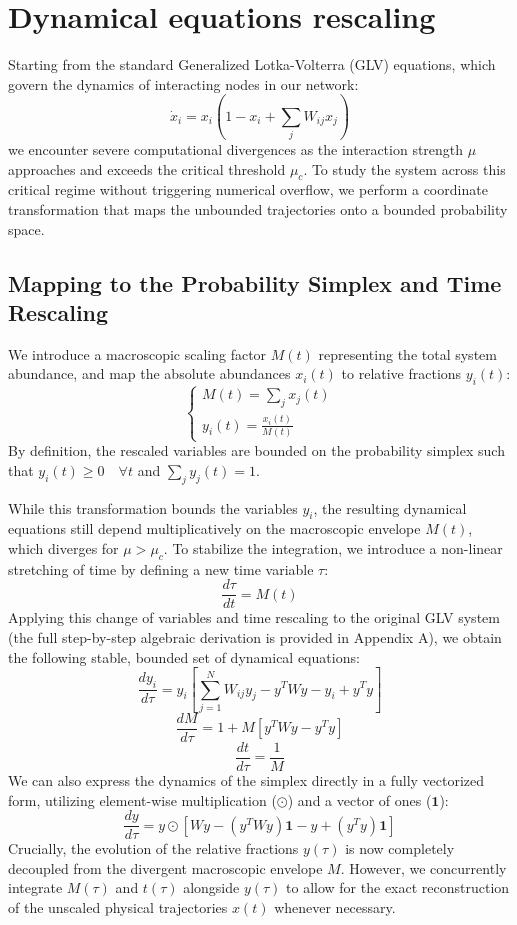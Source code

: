 \chapter{Dynamical equations rescaling}

Starting from the standard Generalized Lotka-Volterra (GLV) equations, which govern the dynamics of interacting nodes in our network:
$$\dot{x}_i = x_i \left( 1 - x_i + \sum_j W_{ij} x_j \right)$$
we encounter severe computational divergences as the interaction strength $\mu$ approaches and exceeds the critical threshold $\mu_c$. To study the system across this critical regime without triggering numerical overflow, we perform a coordinate transformation that maps the unbounded trajectories onto a bounded probability space.

\section{Mapping to the Probability Simplex and Time Rescaling}

We introduce a macroscopic scaling factor $M(t)$ representing the total system abundance, and map the absolute abundances $x_i(t)$ to relative fractions $y_i(t)$:
$$\begin{cases}
M(t) = \sum_j x_j(t) \\
y_i(t) = \frac{x_i(t)}{M(t)}
\end{cases}$$
By definition, the rescaled variables are bounded on the probability simplex such that $y_i(t) \ge 0 \quad \forall t$ and $\sum_j y_j(t) = 1$.

While this transformation bounds the variables $y_i$, the resulting dynamical equations still depend multiplicatively on the macroscopic envelope $M(t)$, which diverges for $\mu > \mu_c$. To stabilize the integration, we introduce a non-linear stretching of time by defining a new time variable $\tau$:
$$\frac{d\tau}{dt} = M(t)$$
Applying this change of variables and time rescaling to the original GLV system (the full step-by-step algebraic derivation is provided in Appendix A), we obtain the following stable, bounded set of dynamical equations:
$$\frac{dy_i}{d\tau} = y_i \left[ \sum_{j=1}^N W_{ij} y_j - y^T W y - y_i + y^T y \right]$$
$$\frac{dM}{d\tau} = 1 + M \left[ y^T W y - y^T y \right]$$
$$\frac{dt}{d\tau} = \frac{1}{M}$$
We can also express the dynamics of the simplex directly in a fully vectorized form, utilizing element-wise multiplication ($\odot$) and a vector of ones ($\mathbf{1}$):
$$\frac{dy}{d\tau} = y \odot \left[ Wy - (y^T W y)\mathbf{1} - y + (y^T y)\mathbf{1} \right]$$
Crucially, the evolution of the relative fractions $y(\tau)$ is now completely decoupled from the divergent macroscopic envelope $M$. However, we concurrently integrate $M(\tau)$ and $t(\tau)$ alongside $y(\tau)$ to allow for the exact reconstruction of the unscaled physical trajectories $x(t)$ whenever necessary.

